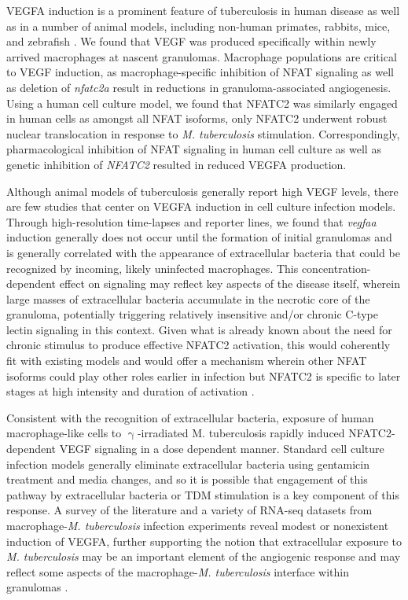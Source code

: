 VEGFA induction is a prominent feature of tuberculosis in human disease as well as in a number of animal models, including non-human primates, rabbits, mice, and zebrafish \citep{Datta2015, Oehlers2015, Polena2016, Harding2019, Cronan2021, Gideon2022}. We found that VEGF was produced specifically within newly arrived macrophages at nascent granulomas. Macrophage populations are critical to VEGF induction, as macrophage-specific inhibition of NFAT signaling as well as deletion of \textit{nfatc2a} result in reductions in granuloma-associated angiogenesis. Using a human cell culture model, we found that NFATC2 was similarly engaged in human cells as amongst all NFAT isoforms, only NFATC2 underwent robust nuclear translocation in response to \textit{M. tuberculosis} stimulation. Correspondingly, pharmacological inhibition of NFAT signaling in human cell culture as well as genetic inhibition of \textit{NFATC2} resulted in reduced VEGFA production.

Although animal models of tuberculosis generally report high VEGF levels, there are few studies that center on VEGFA induction in cell culture infection models. Through high-resolution time-lapses and reporter lines, we found that \textit{vegfaa} induction generally does not occur until the formation of initial granulomas and is generally correlated with the appearance of extracellular bacteria that could be recognized by incoming, likely uninfected macrophages. This concentration-dependent effect on signaling may reflect key aspects of the disease itself, wherein large masses of extracellular bacteria accumulate in the necrotic core of the granuloma, potentially triggering relatively insensitive and/or chronic C-type lectin signaling in this context. Given what is already known about the need for chronic stimulus to produce effective NFATC2 activation, this would coherently fit with existing models and would offer a mechanism wherein other NFAT isoforms could play other roles earlier in infection but NFATC2 is specific to later stages at high intensity and duration of activation \citep{Yissachar2013, Kar2015}. 

Consistent with the recognition of extracellular bacteria, exposure of human macrophage-like cells to $\upgamma$-irradiated M. tuberculosis rapidly induced NFATC2-dependent VEGF signaling in a dose dependent manner. Standard cell culture infection models generally eliminate extracellular bacteria using gentamicin treatment and media changes, and so it is possible that engagement of this pathway by extracellular bacteria or TDM stimulation is a key component of this response. A survey of the literature and a variety \citep{Lee2019, Pisu2020, Hall2021, Looney2021, Pu2021} of RNA-seq datasets from macrophage-\textit{M. tuberculosis} infection experiments reveal modest or nonexistent induction of VEGFA, further supporting the notion that extracellular exposure to \textit{M. tuberculosis} may be an important element of the angiogenic response and may reflect some aspects of the macrophage-\textit{M. tuberculosis} interface within granulomas \citep{Orme2014b}.

